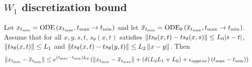 \subsection{\texorpdfstring{$W_1$}{Lg} discretization bound}
\begin{lemma}
    \label{l:discretization_ode}
    Let $x_{\tmin} = \ODE\lrp{x_{\tmax}, \tmax \to \tmin}$ and let $\bx_{\tmin} = \bODE\lrp{\bx_{\tmax}, \tmax \to \tmin}$. 
    Assume that for all $x,y,s,t$, $s_{\theta}(x,t)$ satisfies $\lrn{ts_\theta(x,t) - ts_{\theta}(x,s)}\leq L_0 |s-t|$, $\lrn{ts_{\theta}(x,t)}\leq L_1$ and $\lrn{ts_\theta(x,t) - ts_{\theta}(y,t)}\leq L_2 \lrn{x-y}$. Then
    \begin{align*}
        \lrn{x_{\tmin}- \bx_{\tmin}}
        \leq e^{(\tmax-\tmin) L_2} \lrp{\lrn{x_{\tmax}- \bx_{\tmax}} + \lrp{\delta (L_2 L_1 + L_0) + \eapprox} \lrp{\tmax - \tmin}}
    \end{align*}
\end{lemma}
